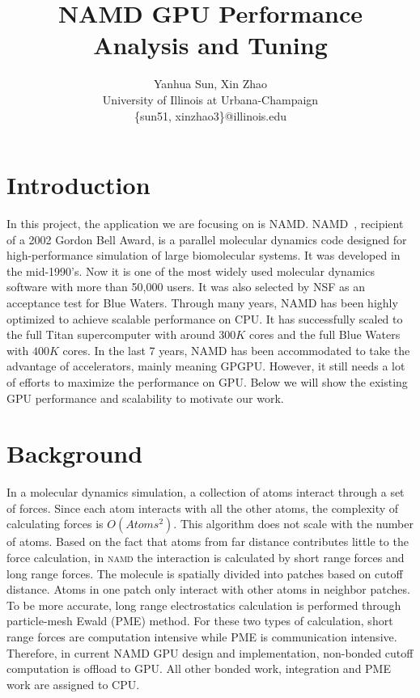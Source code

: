 \documentclass[11pt,onecolumn]{article}
\newcommand{\namd}{\textsc{namd}}
\begin{document}

\title{ NAMD GPU Performance Analysis and Tuning}

\author{
  Yanhua Sun, Xin Zhao\\
  University of Illinois at Urbana-Champaign\\
  \{sun51, xinzhao3\}@illinois.edu
}

\date{}
\maketitle

\lstset{
  basicstyle=\ttfamily,
  showstringspaces=false
}

%
%

\section{Introduction}
In this project, the application we are focusing on is NAMD.
NAMD~\cite{NamdSC02}, recipient of a 2002 Gordon Bell Award, is a parallel molecular 
dynamics code designed for high-performance simulation of large biomolecular systems.
It was developed in the mid-1990's. Now it is one of the most widely used molecular dynamics 
software with more than 50,000 users. It was also selected by NSF as an acceptance test
for Blue Waters.
Through many years, NAMD has been highly optimized to achieve scalable performance on CPU.
It has successfully scaled to the full Titan supercomputer with around $300K$ cores and 
the full Blue Waters with $400K$ cores. In the last 7 years, NAMD has been accommodated
to take the advantage of accelerators, mainly meaning GPGPU. However, it still needs a lot of 
efforts to maximize the performance on GPU. Below we will show the existing GPU performance and 
scalability to motivate our work. 

\section{Background}
In a molecular dynamics simulation, a collection of atoms interact through a set of forces. 
Since each atom interacts with all the other atoms, the complexity of calculating forces
is $O(Atoms^2)$. This algorithm does not scale with the number of atoms. Based on the fact that
atoms from far distance contributes little to the force calculation, in \namd{} the interaction is
calculated by short range forces and long range forces. The molecule  is spatially divided into 
patches based on cutoff distance. Atoms in one patch only interact with other atoms in neighbor patches.
To be more accurate, long range electrostatics calculation is performed through particle-mesh Ewald (PME) method.
For these two types of calculation, short range forces are computation intensive while PME is communication intensive.
Therefore, in current NAMD GPU design and implementation, non-bonded cutoff computation is offload to GPU.
All other bonded work, integration and PME work are assigned to CPU.
\end{document}
